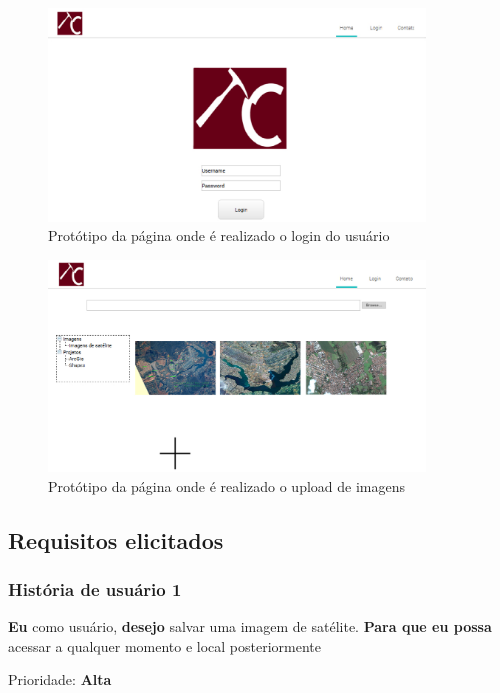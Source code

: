   \label{pagina-inicial}

  \begin{figure}[!htb]
    \centering
    \includegraphics[width=10cm, keepaspectratio=false]{figuras/gerencia/pagina-inicial.eps}
    \caption{Protótipo da página onde é realizado o login do usuário}
  \end{figure}


  \label{pagina-upload}

  \begin{figure}[!htb]
    \centering
    \includegraphics[width=10cm, keepaspectratio=false]{figuras/gerencia/pagina-upload.eps}
    \caption{Protótipo da página onde é realizado o upload de imagens}
  \end{figure}

\subsection{Requisitos elicitados}

  \subsubsection{História de usuário 1}
    \textbf{Eu} como usuário, \textbf{desejo} salvar uma imagem de satélite. \textbf{Para que eu possa} acessar a qualquer momento e local posteriormente

    Prioridade: \textbf{Alta}

